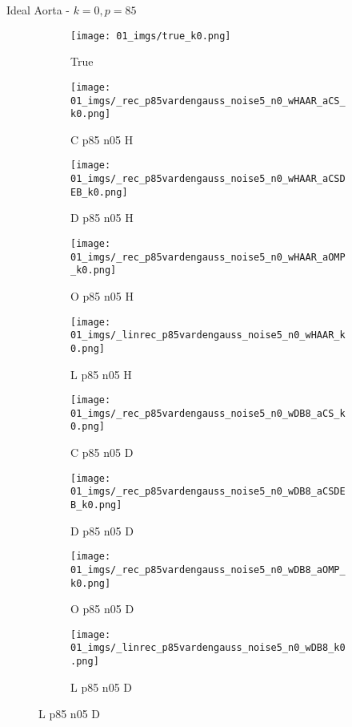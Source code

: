 \begin{frame}{Ideal Aorta - $k=0,p=85$}{}
\begin{figure}

\begin{subfigure}{0.1\textwidth}
\texttt{[image: 01\_imgs/true\_k0.png]}
\caption*{\Tiny True}
\end{subfigure}
\begin{subfigure}{0.1\textwidth}
\texttt{[image: 01\_imgs/\_rec\_p85vardengauss\_noise5\_n0\_wHAAR\_aCS\_k0.png]}
\caption*{\Tiny C p85 n05 H}
\end{subfigure}
\begin{subfigure}{0.1\textwidth}
\texttt{[image: 01\_imgs/\_rec\_p85vardengauss\_noise5\_n0\_wHAAR\_aCSDEB\_k0.png]}
\caption*{\Tiny D p85 n05 H}
\end{subfigure}
\begin{subfigure}{0.1\textwidth}
\texttt{[image: 01\_imgs/\_rec\_p85vardengauss\_noise5\_n0\_wHAAR\_aOMP\_k0.png]}
\caption*{\Tiny O p85 n05 H}
\end{subfigure}
\begin{subfigure}{0.1\textwidth}
\texttt{[image: 01\_imgs/\_linrec\_p85vardengauss\_noise5\_n0\_wHAAR\_k0.png]}
\caption*{\Tiny L p85 n05 H}
\end{subfigure}
\begin{subfigure}{0.1\textwidth}
\texttt{[image: 01\_imgs/\_rec\_p85vardengauss\_noise5\_n0\_wDB8\_aCS\_k0.png]}
\caption*{\Tiny C p85 n05 D}
\end{subfigure}
\begin{subfigure}{0.1\textwidth}
\texttt{[image: 01\_imgs/\_rec\_p85vardengauss\_noise5\_n0\_wDB8\_aCSDEB\_k0.png]}
\caption*{\Tiny D p85 n05 D}
\end{subfigure}
\begin{subfigure}{0.1\textwidth}
\texttt{[image: 01\_imgs/\_rec\_p85vardengauss\_noise5\_n0\_wDB8\_aOMP\_k0.png]}
\caption*{\Tiny O p85 n05 D}
\end{subfigure}
\begin{subfigure}{0.1\textwidth}
\texttt{[image: 01\_imgs/\_linrec\_p85vardengauss\_noise5\_n0\_wDB8\_k0.png]}
\caption*{\Tiny L p85 n05 D}
\end{subfigure}

\vspace{5pt}


\end{figure}
\end{frame}
